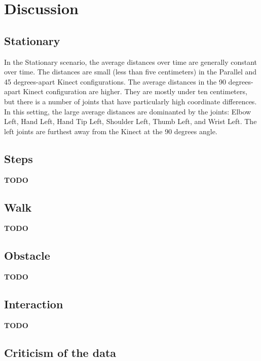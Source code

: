 \section{Discussion}

\subsection{Stationary}

In the Stationary scenario, the average distances over time are generally constant over time. The distances are small (less than five centimeters) in the Parallel and 45 degrees-apart Kinect configurations. The average distances in the 90 degrees-apart Kinect configuration are higher. They are mostly under ten centimeters, but there is a number of joints that have particularly high coordinate differences. In this setting, the large average distances are dominanted by the joints: Elbow Left, Hand Left, Hand Tip Left, Shoulder Left, Thumb Left, and Wrist Left. The left joints are furthest away from the Kinect at the 90 degrees angle.

\subsection{Steps}

\textbf{TODO}

\subsection{Walk}

\textbf{TODO}

\subsection{Obstacle}

\textbf{TODO}

\subsection{Interaction}

\textbf{TODO}

\subsection{Criticism of the data}
